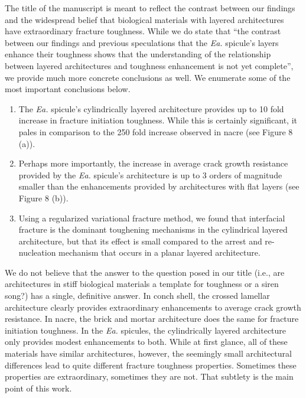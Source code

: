 \documentclass[11pt,letterpaper]{report}
\makeatletter
\newcommand{\EA}{\textit{Ea.\@}\xspace}
\makeatother
\begin{document}
The title of the manuscript is meant to reflect the contrast between our findings and the widespread belief that biological materials with layered architectures have extraordinary fracture toughness. While we do state that ``the contrast between our findings and previous speculations that the \EA spicule's layers enhance their toughness shows that the understanding of the relationship between layered architectures and toughness enhancement is not yet complete'', we provide much more concrete conclusions as well. We enumerate some of the most important conclusions below.
%
\begin{enumerate}
    \item The \EA spicule's cylindrically layered architecture provides up to 10 fold increase in fracture initiation toughness. While this is certainly significant, it pales in comparison to the 250 fold increase observed in nacre (see Figure 8 (a)).
    \item Perhaps more importantly, the increase in average crack growth resistance provided by the \EA spicule's architecture is up to 3 orders of magnitude smaller than the enhancements provided by architectures with flat layers (see Figure 8 (b)).
    \item Using a regularized variational fracture method, we found that interfacial fracture is the dominant toughening mechanisms in the cylindrical layered architecture, but that its effect is small compared to the arrest and re-nucleation mechanism that occurs in a planar layered architecture.
\end{enumerate}
%
We do not believe that the answer to the question posed in our title (i.e., are architectures in stiff biological materials a template for toughness or a siren song?) has a single, definitive answer. In conch shell, the crossed lamellar architecture clearly provides extraordinary enhancements to average crack growth resistance. In nacre, the brick and mortar architecture does the same for fracture initiation toughness. In the \EA spicules, the cylindrically layered architecture only provides modest enhancements to both. While at first glance, all of these materials have similar architectures, however, the seemingly small architectural differences lead to quite different fracture toughness properties. Sometimes these properties are extraordinary, sometimes they are not. That subtlety is the main point of this work.

\clearpage


\end{document}
